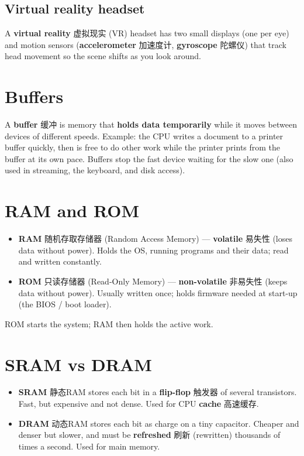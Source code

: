 \documentclass[11pt]{article}
\begin{document}
\subsection*{Virtual reality headset}

A \textbf{virtual reality} 虚拟现实 (VR) headset has two small displays (one per eye) and motion sensors (\textbf{accelerometer} 加速度计, \textbf{gyroscope} 陀螺仪) that track head movement so the scene shifts as you look around.

\section*{Buffers}

A \textbf{buffer} 缓冲 is memory that \textbf{holds data temporarily} while it moves between devices of different speeds. Example: the CPU writes a document to a printer buffer quickly, then is free to do other work while the printer prints from the buffer at its own pace. Buffers stop the fast device waiting for the slow one (also used in streaming, the keyboard, and disk access).

\section*{RAM and ROM}

\begin{itemize}
\item \textbf{RAM} 随机存取存储器 (Random Access Memory) — \textbf{volatile} 易失性 (loses data without power). Holds the OS, running programs and their data; read and written constantly.

\item \textbf{ROM} 只读存储器 (Read-Only Memory) — \textbf{non-volatile} 非易失性 (keeps data without power). Usually written once; holds firmware needed at start-up (the BIOS / boot loader).

\end{itemize}

ROM starts the system; RAM then holds the active work.

\section*{SRAM vs DRAM}

\begin{itemize}
\item \textbf{SRAM} 静态RAM stores each bit in a \textbf{flip-flop} 触发器 of several transistors. Fast, but expensive and not dense. Used for CPU \textbf{cache} 高速缓存.

\item \textbf{DRAM} 动态RAM stores each bit as charge on a tiny capacitor. Cheaper and denser but slower, and must be \textbf{refreshed} 刷新 (rewritten) thousands of times a second. Used for main memory.

\end{itemize}
\end{document}
